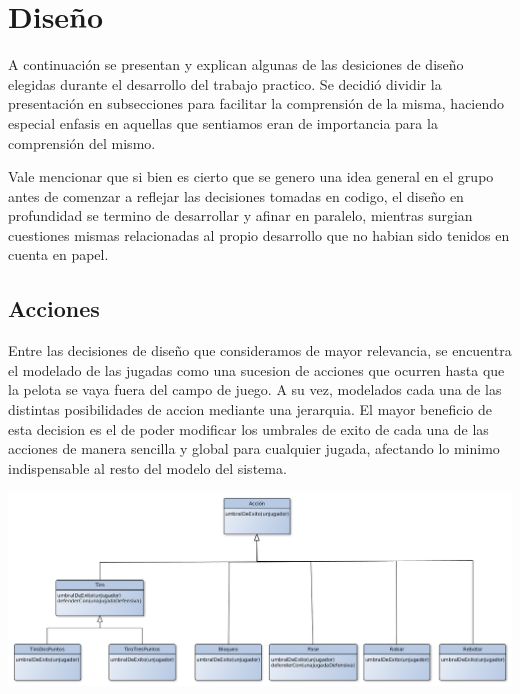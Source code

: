 \section{Diseño}
A continuación se presentan y explican algunas de las desiciones de diseño elegidas durante el desarrollo del trabajo practico.
Se decidió dividir la presentación en subsecciones para facilitar la comprensión de la misma, haciendo especial enfasis en aquellas que sentiamos eran de importancia para la comprensión del mismo.

Vale mencionar que si bien es cierto que se genero una idea general en el grupo antes de comenzar a reflejar las decisiones tomadas en codigo, el diseño en profundidad se termino de desarrollar y afinar en paralelo, mientras surgian cuestiones mismas relacionadas al propio desarrollo que no habian sido tenidos en cuenta en papel. 

\subsection{Acciones}
Entre las decisiones de diseño que consideramos de mayor relevancia, se encuentra el modelado de las jugadas como una sucesion de acciones que ocurren hasta que la pelota se vaya fuera del campo de juego. A su vez, modelados cada una de las distintas posibilidades de accion mediante una jerarquia. El mayor beneficio de esta decision es el de poder modificar los umbrales de exito de cada una de las acciones de manera sencilla y global para cualquier jugada, afectando lo minimo indispensable al resto del modelo del sistema.
\begin{center}

\includegraphics[scale=0.35]{diagramas/acciones.png}
\end{center}

